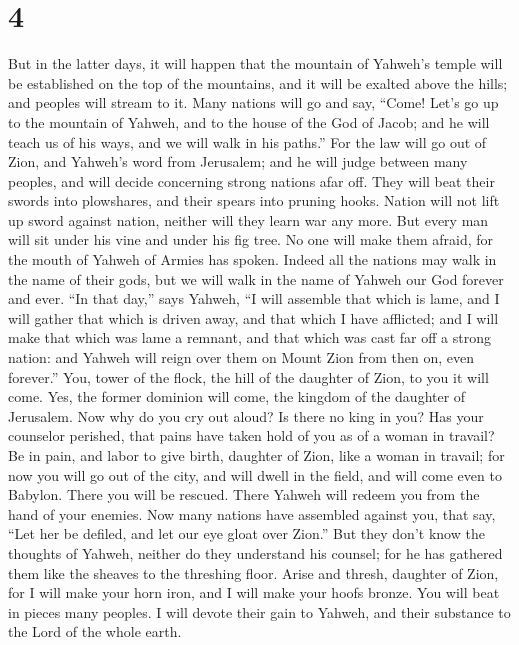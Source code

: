 \hypertarget{section-3}{%
\section{4}\label{section-3}}

 But in the latter days, it will happen that the mountain
of Yahweh's temple will be established on the top of the mountains, and
it will be exalted above the hills; and peoples will stream to it.
 Many nations will go and say, ``Come! Let's go up to the
mountain of Yahweh, and to the house of the God of Jacob; and he will
teach us of his ways, and we will walk in his paths.'' For the law will
go out of Zion, and Yahweh's word from Jerusalem;  and he
will judge between many peoples, and will decide concerning strong
nations afar off. They will beat their swords into plowshares, and their
spears into pruning hooks. Nation will not lift up sword against nation,
neither will they learn war any more.  But every man will
sit under his vine and under his fig tree. No one will make them afraid,
for the mouth of Yahweh of Armies has spoken.  Indeed all
the nations may walk in the name of their gods, but we will walk in the
name of Yahweh our God forever and ever.  ``In that day,''
says Yahweh, ``I will assemble that which is lame, and I will gather
that which is driven away, and that which I have afflicted;
 and I will make that which was lame a remnant, and that
which was cast far off a strong nation: and Yahweh will reign over them
on Mount Zion from then on, even forever.''  You, tower of
the flock, the hill of the daughter of Zion, to you it will come. Yes,
the former dominion will come, the kingdom of the daughter of Jerusalem.
 Now why do you cry out aloud? Is there no king in you?
Has your counselor perished, that pains have taken hold of you as of a
woman in travail?  Be in pain, and labor to give birth,
daughter of Zion, like a woman in travail; for now you will go out of
the city, and will dwell in the field, and will come even to Babylon.
There you will be rescued. There Yahweh will redeem you from the hand of
your enemies.  Now many nations have assembled against
you, that say, ``Let her be defiled, and let our eye gloat over Zion.''
 But they don't know the thoughts of Yahweh, neither do
they understand his counsel; for he has gathered them like the sheaves
to the threshing floor.  Arise and thresh, daughter of
Zion, for I will make your horn iron, and I will make your hoofs bronze.
You will beat in pieces many peoples. I will devote their gain to
Yahweh, and their substance to the Lord of the whole earth.

